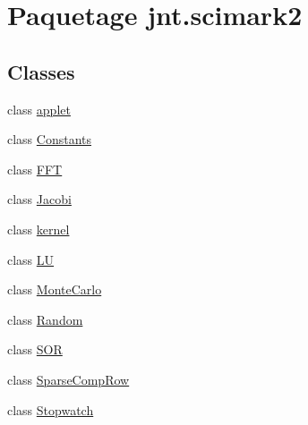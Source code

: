 \hypertarget{namespacejnt_1_1scimark2}{\section{Paquetage jnt.\-scimark2}
\label{namespacejnt_1_1scimark2}
}
\subsection*{Classes}
\begin{DoxyCompactItemize}
\item 
class \hyperlink{classjnt_1_1scimark2_1_1applet}{applet}
\item 
class \hyperlink{classjnt_1_1scimark2_1_1Constants}{Constants}
\item 
class \hyperlink{classjnt_1_1scimark2_1_1FFT}{F\-F\-T}
\item 
class \hyperlink{classjnt_1_1scimark2_1_1Jacobi}{Jacobi}
\item 
class \hyperlink{classjnt_1_1scimark2_1_1kernel}{kernel}
\item 
class \hyperlink{classjnt_1_1scimark2_1_1LU}{L\-U}
\item 
class \hyperlink{classjnt_1_1scimark2_1_1MonteCarlo}{Monte\-Carlo}
\item 
class \hyperlink{classjnt_1_1scimark2_1_1Random}{Random}
\item 
class \hyperlink{classjnt_1_1scimark2_1_1SOR}{S\-O\-R}
\item 
class \hyperlink{classjnt_1_1scimark2_1_1SparseCompRow}{Sparse\-Comp\-Row}
\item 
class \hyperlink{classjnt_1_1scimark2_1_1Stopwatch}{Stopwatch}
\end{DoxyCompactItemize}
